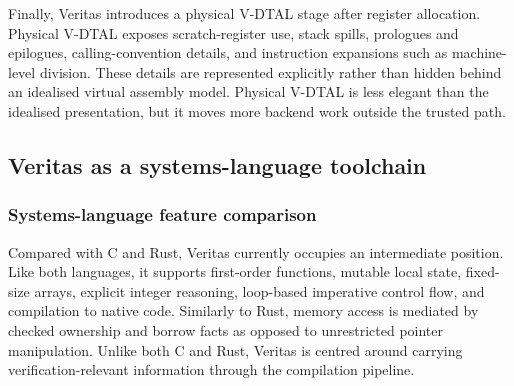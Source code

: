Finally, Veritas introduces a physical V-DTAL stage after register allocation. Physical V-DTAL exposes scratch-register use, stack spills, prologues and epilogues, calling-convention details, and instruction expansions such as machine-level division. These details are represented explicitly rather than hidden behind an idealised virtual assembly model. Physical V-DTAL is less elegant than the idealised presentation, but it moves more backend work outside the trusted path.

\subsection{Veritas as a systems-language toolchain}\label{sec:veritas-sys-eval}


\subsubsection{Systems-language feature comparison}

Compared with C and Rust, Veritas currently occupies an intermediate position. Like both languages, it supports first-order functions, mutable local state, fixed-size arrays, explicit integer reasoning, loop-based imperative control flow, and compilation to native code. Similarly to Rust, memory access is mediated by checked ownership and borrow facts as opposed to unrestricted pointer manipulation. Unlike both C and Rust, Veritas is centred around carrying verification-relevant information through the compilation pipeline.

